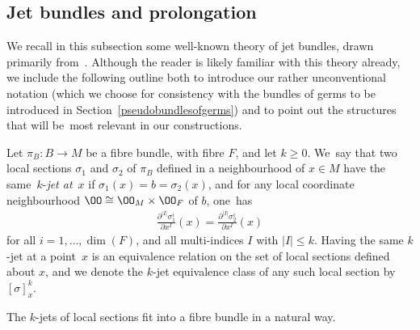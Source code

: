 \subsection{Jet bundles and prolongation}

We recall in this subsection some well-known theory of jet bundles, drawn primarily from~\cite{varbi, saunders}. Although the reader is likely familiar with this theory already, we include the following outline both to introduce our rather unconventional notation (which we choose for consistency with the bundles of germs to be introduced in Section~\ref{pseudobundlesofgerms}) and to point out the structures that will be~most relevant in our constructions.

\begin{Definition}
Let $\pi_{B}\colon B\rightarrow M$ be a fibre bundle, with fibre $F$, and let $k\geq0$. We~say that two local sections $\sigma_{1}$ and $\sigma_{2}$ of $\pi_{B}$ defined in a neighbourhood of $x\in M$ have the same~$k$-\textit{jet at}~$x$ if $\sigma_{1}(x) =b= \sigma_{2}(x)$, and for any local coordinate neighbourhood $\OO\cong\OO_{M}\times\OO_{F}$ of $b$, one~has
\begin{gather*}
\frac{\partial^{|I|}\sigma^{i}_{1}}{\partial x^{I}}(x) = \frac{\partial^{|I|}\sigma^{i}_{2}}{\partial x^{I}}(x)
\end{gather*}
for all $i = 1,\dots,\dim(F)$, and all multi-indices $I$ with $|I|\leq k$. Having the same $k$-jet at a point~$x$ is an equivalence relation on the set of local sections defined about $x$, and we denote the $k$-jet equivalence class of any such local section by $[\sigma]^{k}_{x}$.
\end{Definition}

The $k$-jets of local sections fit into a fibre bundle in a natural way.


